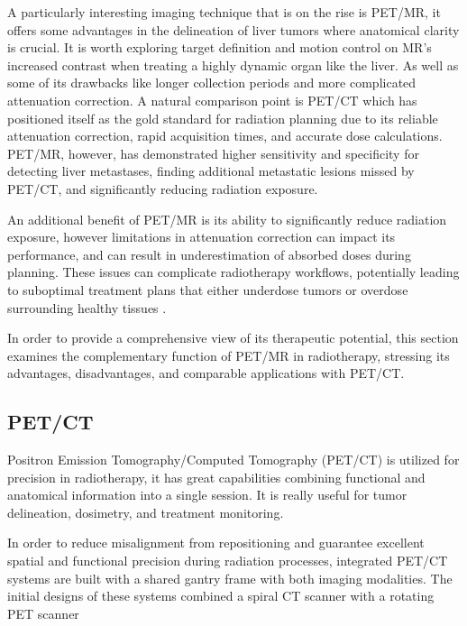 \begin{multicols}{2}


A particularly interesting imaging technique that is on the rise is PET/MR, it offers some advantages in the delineation of liver tumors where anatomical clarity is crucial. It is worth exploring target definition and motion control on MR's increased contrast when treating a highly dynamic organ like the liver. As well as some of its drawbacks like longer collection periods and more complicated attenuation correction. A natural comparison point is PET/CT which has positioned itself as the gold standard for radiation planning due to its reliable attenuation correction, rapid acquisition times, and accurate dose calculations. PET/MR, however, has demonstrated higher sensitivity and specificity for detecting liver metastases, finding additional metastatic lesions missed by PET/CT, and significantly reducing radiation exposure. \cite{frontiers2021}%

An additional benefit of PET/MR is its ability to significantly reduce radiation exposure, however limitations in attenuation correction can impact its performance, and can result in underestimation of absorbed doses during planning. \cite{ajr2012}%
These issues can complicate radiotherapy workflows, potentially leading to suboptimal treatment plans that either underdose tumors or overdose surrounding healthy tissues \cite{pmc2023}.

In order to provide a comprehensive view of its therapeutic potential, this section examines the complementary function of PET/MR in radiotherapy, stressing its advantages, disadvantages, and comparable applications with PET/CT.

\subsection{PET/CT}
Positron Emission Tomography/Computed Tomography (PET/CT) is utilized for precision in radiotherapy, it has great capabilities combining functional and anatomical information into a single session. It is really useful for tumor delineation, dosimetry, and treatment monitoring.

In order to reduce misalignment from repositioning and guarantee excellent spatial and functional precision during radiation processes, integrated PET/CT systems are built with a shared gantry frame with both imaging modalities. The initial designs of these systems combined a spiral CT scanner with a rotating PET scanner \cite{beyer2000}%


\end{multicols}
